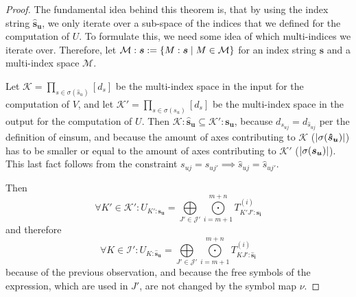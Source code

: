 \begin{proof}
    \small
    The fundamental idea behind this theorem is, that by using the index string $\bm{\hat{s}_u}$, we only iterate over a sub-space of the indices that we defined for the computation of $U$.
    To formulate this, we need some idea of which multi-indices we iterate over.
    Therefore, let $\mathcal{M}:\bm{s} := \lbrace M: \bm{s} \mid M \in \mathcal{M} \rbrace$ for an index string $\bm{s}$ and a multi-index space $\mathcal{M}$.

    Let $\mathcal{K} = \prod_{s \in \sigma(\hat{s}_u)} [d_s]$ be the multi-index space in the input for the computation of $V$,
    and let $\mathcal{K}' = \prod_{s \in \sigma(s_u)} [d_s]$ be the multi-index space in the output for the computation of $U$.
    Then $\mathcal{K}:\bm{\hat{s}_u} \subseteq \mathcal{K}':\bm{s_u}$, because $d_{s_{uj}} = d_{\hat{s}_{uj}}$ per the definition of einsum,
    and because the amount of axes contributing to $\mathcal{K}$ ($\left| \sigma(\bm{\hat{s}_u}) \right|$) has to be smaller or equal to the amount of axes contributing to $\mathcal{K}'$ ($\left| \sigma(\bm{s_u}) \right|$).
    This last fact follows from the constraint $s_{uj} = s_{uj'} \implies \hat{s}_{uj} = \hat{s}_{uj'}$.

    Then
    $$\forall K' \in \mathcal{K}': U_{K': \bm{s_u}} = \bigoplus\limits_{J' \in \mathcal{J}'}\bigodot\limits_{i = m + 1}^{m + n} T^{(i)}_{K'J':\bm{s_{i}}}$$
    and therefore
    $$\forall K \in \mathcal{I}': U_{K: \bm{\hat{s}_u}} = \bigoplus\limits_{J' \in \mathcal{J}'}\bigodot\limits_{i = m + 1}^{m + n} T^{(i)}_{KJ':\bm{\hat{s}_{i}}}$$
    because of the previous observation,
    and because the free symbols of the expression, which are used in $J'$, are not changed by the symbol map $\nu$.


\end{proof}

